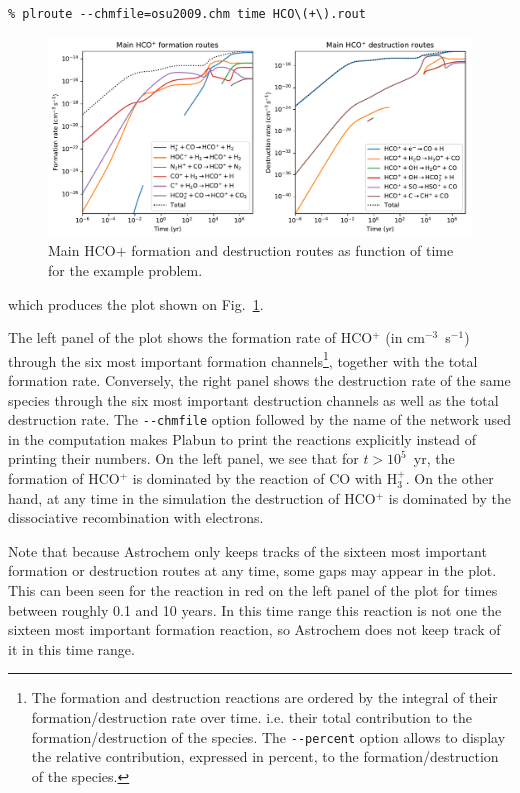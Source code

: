 \documentclass[a4paper,12pt]{article}
\begin{document}
\begin{verbatim}
% plroute --chmfile=osu2009.chm time HCO\(+\).rout
\end{verbatim}

\begin{figure}
  \begin{center}
    \includegraphics[width=\columnwidth]{fig2.pdf}
  \end{center}
  \caption{Main HCO${+}$ formation and destruction routes as function
    of time for the example problem.}
  \label{fig:example-routes}
\end{figure}

\noindent
which produces the plot shown on Fig.~\ref{fig:example-routes}.

The left panel of the plot shows the formation rate of HCO$^{+}$ (in
cm$^{-3}$~s$^{-1}$) through the six most important formation
channels\footnote{The formation and destruction reactions are ordered
  by the integral of their formation/destruction rate over
  time. i.e. their total contribution to the formation/destruction of
  the species. The \verb=--percent= option allows to display the
  relative contribution, expressed in percent, to the
  formation/destruction of the species.}, together with the total
formation rate. Conversely, the right panel shows the destruction rate
of the same species through the six most important destruction
channels as well as the total destruction rate. The \verb=--chmfile=
option followed by the name of the network used in the computation
makes Plabun to print the reactions explicitly instead of printing
their numbers. On the left panel, we see that for $t > 10^{5}$~yr, the
formation of HCO$^{+}$ is dominated by the reaction of CO with
H$_{3}^{+}$. On the other hand, at any time in the simulation the
destruction of HCO$^{+}$ is dominated by the dissociative
recombination with electrons.

Note that because Astrochem only keeps tracks of the sixteen most
important formation or destruction routes at any time, some gaps may
appear in the plot. This can been seen for the reaction in red on the
left panel of the plot for times between roughly 0.1 and 10 years. In
this time range this reaction is not one the sixteen most important
formation reaction, so Astrochem does not keep track of it in this
time range.
\end{document}
